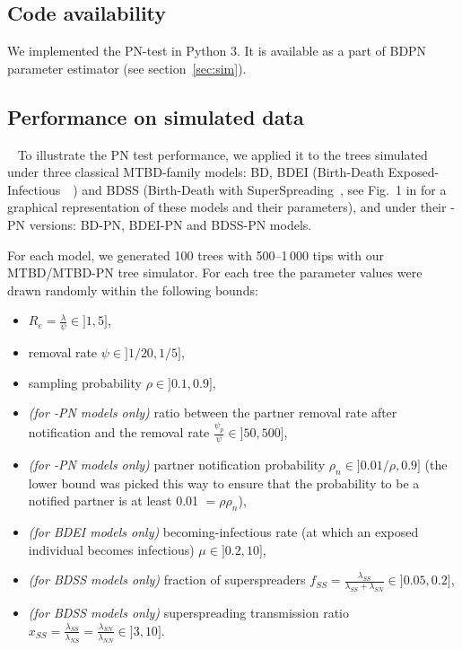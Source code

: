 \documentclass[a4paper,10pt]{article}
\begin{document}
\subsection*{Code availability}
We implemented the PN-test in Python 3. It is available as a part of BDPN parameter estimator (see section~\ref{sec:sim}).


\subsection{Performance on simulated data}~\label{sec:test:sim}
To illustrate the PN test performance, we applied it to the trees simulated under three classical MTBD-family models: BD, BDEI (Birth-Death Exposed-Infectious~~\citep{Stadler2014}) and BDSS (Birth-Death with SuperSpreading~\citep{Stadler2013a}, see Fig.~1 in \citet{Voznica2021} for a graphical representation of these models and their parameters), and under their -PN versions: BD-PN, BDEI-PN and BDSS-PN models. 

For each model, we generated 100 trees with 500--1\,000 tips with our MTBD/MTBD-PN tree simulator. For each tree the parameter values were drawn randomly within the following bounds:
\begin{itemize}
\item $R_e = \frac{{\lambda}}{{\psi}} \in ]1, 5]$, 
\item removal rate $\psi \in ]1 / 20, 1 / 5]$,
\item sampling probability $\rho \in ]0.1, 0.9]$,
\item \textit{(for -PN models only)} ratio between the partner removal rate after notification and the removal rate $\frac{\psi_p}{\psi} \in ]50, 500]$,
\item \textit{(for -PN models only)} partner notification probability $\rho_n \in ]0.01/\rho, 0.9]$ (the lower bound was picked this way to ensure that the probability to be a notified partner is at least 0.01 $=\rho \rho_n$),
\item \textit{(for BDEI models only)} becoming-infectious rate (at which an exposed individual becomes infectious) $\mu \in ]0.2, 10]$,
\item \textit{(for BDSS models only)} fraction of superspreaders $f_{SS} = \frac{\lambda_{SS}}{\lambda_{SS} + \lambda_{SN}} \in ]0.05, 0.2]$,
\item \textit{(for BDSS models only)} superspreading transmission ratio $x_{SS} = \frac{\lambda_{SS}}{\lambda_{NS}} = \frac{\lambda_{SN}}{\lambda_{NN}} \in ]3, 10]$.
\end{itemize} 
\end{document}
